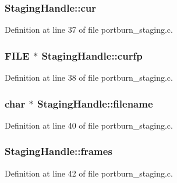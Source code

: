 \subsubsection[{\texorpdfstring{cur}{cur}}]{ Staging\+Handle\+::cur}\hypertarget{struct_staging_handle_a5b74fbb322efa94b93d196e462ef78d6}{}\label{struct_staging_handle_a5b74fbb322efa94b93d196e462ef78d6}


Definition at line 37 of file portburn\+\_\+staging.\+c.

\subsubsection[{\texorpdfstring{curfp}{curfp}}]{\setlength{\rightskip}{0pt plus 5cm}F\+I\+LE $\ast$ Staging\+Handle\+::curfp}\hypertarget{struct_staging_handle_a712692b2f7f84a1164c33e5163718001}{}\label{struct_staging_handle_a712692b2f7f84a1164c33e5163718001}


Definition at line 38 of file portburn\+\_\+staging.\+c.

\subsubsection[{\texorpdfstring{filename}{filename}}]{\setlength{\rightskip}{0pt plus 5cm}char $\ast$ Staging\+Handle\+::filename}\hypertarget{struct_staging_handle_aa6e76e28477fa7789961f45e8fb03cca}{}\label{struct_staging_handle_aa6e76e28477fa7789961f45e8fb03cca}


Definition at line 40 of file portburn\+\_\+staging.\+c.

\subsubsection[{\texorpdfstring{frames}{frames}}]{ Staging\+Handle\+::frames}\hypertarget{struct_staging_handle_ab99bbdc68483ab5e022c782021c7706f}{}\label{struct_staging_handle_ab99bbdc68483ab5e022c782021c7706f}


Definition at line 42 of file portburn\+\_\+staging.\+c.

